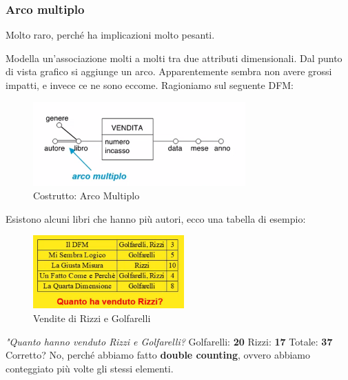 \subsubsection{Arco multiplo}
\begin{info}
	Molto raro, perché ha implicazioni molto pesanti.
\end{info}
Modella un'associazione molti a molti tra due attributi dimensionali. Dal punto di vista grafico si aggiunge un arco.\newline
Apparentemente sembra non avere grossi impatti, e invece ce ne sono eccome.\newline
Ragioniamo sul seguente DFM:
\begin{figure}[H]
	\begin{center}
		\includegraphics[width=0.55\linewidth]{img/mult.PNG}
		\caption{Costrutto: Arco Multiplo}
	\end{center}
\end{figure}
\noindent Esistono alcuni libri che hanno più autori, ecco una tabella di esempio:
\begin{figure}[H]
	\begin{center}
		\includegraphics[width=0.4\linewidth]{img/rizzi-golfarelli.PNG}
		\caption{Vendite di Rizzi e Golfarelli}
	\end{center}
\end{figure}
\noindent\textit{"Quanto hanno venduto Rizzi e Golfarelli?}\newline\newline
Golfarelli: \textbf{20}\newline
Rizzi: \textbf{17}\newline
Totale: \textbf{37}\newline\newline
Corretto? No, perché abbiamo fatto \textbf{double counting}, ovvero abbiamo conteggiato più volte gli stessi elementi.\newline
